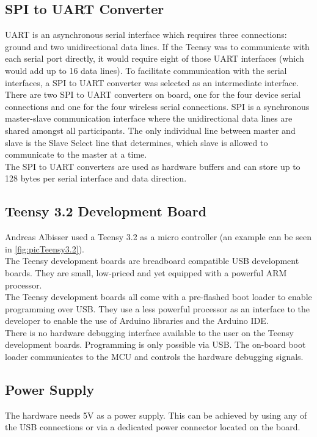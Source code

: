 \subsection{SPI to UART Converter}
UART is an asynchronous serial interface which requires three connections: ground and two unidirectional data lines. If the Teensy was to communicate with each serial port directly, it would require eight of those UART interfaces (which would add up to 16 data lines). To facilitate communication with the serial interfaces, a SPI to UART converter was selected as an intermediate interface.\\
There are two SPI to UART converters on board, one for the four device serial connections and one for the four wireless serial connections. SPI is a synchronous master-slave communication interface where the unidirectional data lines are shared amongst all participants. The only individual line between master and slave is the Slave Select line that determines, which slave is allowed to communicate to the master at a time. \\
The SPI to UART converters are used as hardware buffers and can store up to 128 bytes per serial interface and data direction.
%
\subsection{Teensy 3.2 Development Board}
Andreas Albisser used a Teensy 3.2 as a micro controller (an example can be seen in \autoref{fig:picTeensy3.2}).\\
The Teensy development boards are breadboard compatible USB development boards. They are small, low-priced and yet equipped with a powerful ARM processor.\\
The Teensy development boards all come with a pre-flashed boot loader to enable programming over USB. They use a less powerful processor as an interface to the developer to enable the use of Arduino libraries and the Arduino IDE.\\
There is no hardware debugging interface available to the user on the Teensy development boards. Programming is only possible via USB. The on-board boot loader communicates to the MCU and controls the hardware debugging signals.\\
%
%
\subsection{Power Supply}
The hardware needs 5V as a power supply. This can be achieved by using any of the USB connections or via a dedicated power connector located on the board. \\
%
%
%
%
%
%
%
